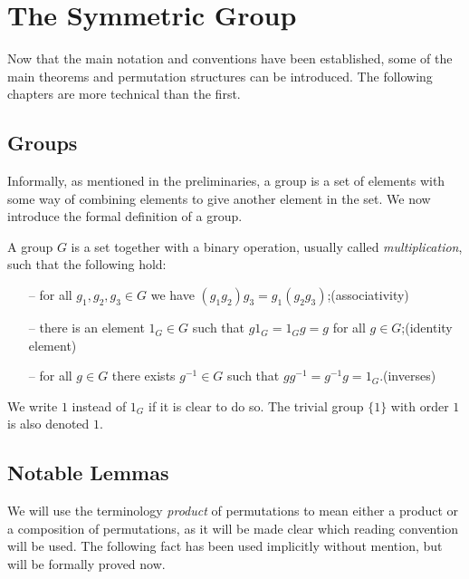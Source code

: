 \section{The Symmetric Group}\label{sec:theorems}%

Now that the main notation and conventions have been established, some of the main theorems and permutation structures can be introduced. The following chapters are more technical than the first.

\subsection{Groups}\label{subsec:groups}

Informally, as mentioned in the preliminaries, a group is a set of elements with some way of combining elements to give another element in the set. We now introduce the formal definition of a group.

\begin{definition}[(Group)]
    A group \(G\) is a set together with a binary operation, usually called \textit{multiplication}, such that the following hold:
    \vspace*{-10pt}\begin{enumerate}[nolistsep]
        \item[--] for all \(g_{1}, g_{2}, g_{3} \in G\) we have \((g_{1}g_{2})g_{3} = g_{1}(g_{2}g_{3})\);\hfill(associativity)
        \item[--] there is an element \(1_{G} \in G\) such that \(g1_{G} = 1_{G}g = g\) for all \(g \in G\);\hfill(identity element)
        \item[--] for all \(g \in G\) there exists \(g^{-1} \in G\) such that \(gg^{-1} = g^{-1}g = 1_{G}\).\hfill(inverses)
    \end{enumerate}\vspace*{-10pt}
    We write \(1\) instead of \(1_{G}\) if it is clear to do so. The trivial group \(\{1\}\) with order \(1\) is also denoted \(1\).
\end{definition}

\subsection{Notable Lemmas}

We will use the terminology \textit{product} of permutations to mean either a product or a composition of permutations, as it will be made clear which reading convention will be used. The following fact has been used implicitly without mention, but will be formally proved now.

